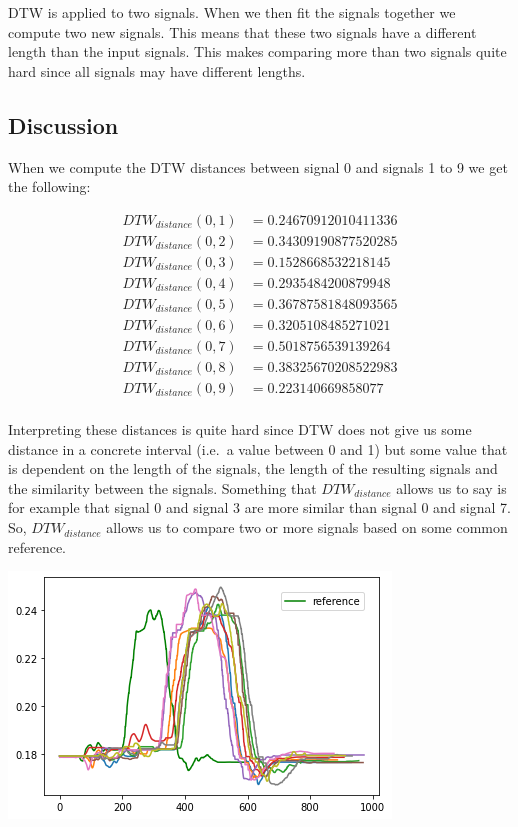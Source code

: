 \documentclass[11pt,a4paper]{article}
\begin{document}
DTW is applied to two signals. When we then fit the signals together we compute two new signals. This means that these two signals have a different length than the input signals. This makes comparing more than two signals quite hard since all signals may have different lengths.

\subsection{Discussion}

When we compute the DTW distances between signal 0 and signals 1 to 9 we get the following:

\begin{align*}
    DTW_{distance}(0,1) &= 0.24670912010411336 \\
    DTW_{distance}(0,2) &= 0.34309190877520285 \\
    DTW_{distance}(0,3) &= 0.1528668532218145 \\
    DTW_{distance}(0,4) &= 0.2935484200879948  \\
    DTW_{distance}(0,5) &= 0.36787581848093565 \\
    DTW_{distance}(0,6) &= 0.3205108485271021 \\
    DTW_{distance}(0,7) &= 0.5018756539139264 \\
    DTW_{distance}(0,8) &= 0.38325670208522983 \\
    DTW_{distance}(0,9) &= 0.223140669858077 \\
\end{align*}
    
Interpreting these distances is quite hard since DTW does not give us some distance in a concrete interval (i.e.~a value between 0 and 1) but some value that is dependent on the length of the signals, the length of the resulting signals and the similarity between the signals. Something that $DTW_{distance}$ allows us to say is for example that signal 0 and signal 3 are more similar than signal 0 and signal 7. So, $DTW_{distance}$ allows us to compare two or more signals based on some common reference.

\begin{center}
    \includegraphics[scale=0.7]{images/dtw_aligned.png}\\
\end{center}
\end{document}
